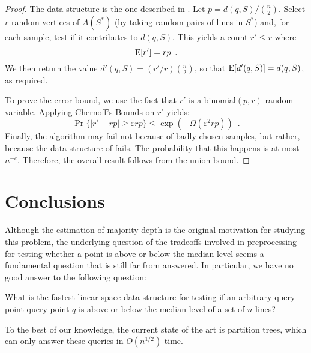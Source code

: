 \documentclass{cccg12}
\newcommand{\eps}{\varepsilon}
\begin{document}
\begin{proof}
  The data structure is the one described in .
  Let $p=d(q,S)/\binom{n}{2}$.  Select $r$ random vertices of $A(S^*)$
  (by taking random pairs of lines in $S^*$) and, for each sample, test
  if it contributes to $d(q,S)$.  This yields a count $r' \le r$ where
  \[ 
     \mathrm{E}[r'] = rp \enspace .
  \]
  We then return the value $d'(q,S)=(r'/r)\binom{n}{2}$, so that
  $\mathrm{E}[d'(q,S)]=d(q,S)$, as required.

  To prove the error bound, we use the fact that $r'$ is a binomial$(p,r)$
  random variable.  Applying Chernoff's Bounds on $r'$ yields:
  \[
     \Pr\{|r' - rp| \ge \eps rp\} \le \exp(-\Omega(\eps^2rp)) \enspace .
  \]
  Finally, the algorithm may fail not because of badly chosen samples,
  but rather, because the data structure of  fails.
  The probability that this happens is at most $n^{-c}$. Therefore,
  the overall result follows from the union bound.
\end{proof}

\section{Conclusions}

Although the estimation of majority depth is the original motivation for
studying this problem, the underlying question of the tradeoffs involved
in preprocessing for testing whether a point is above or below the median
level seems a fundamental question that is still far from answered.  In particular, we have no good answer to the following question:

\begin{op}
What is the fastest linear-space data structure for testing if an
arbitrary query point query point $q$ is above or below the median level
of a set of $n$ lines?
\end{op}

To the best of our knowledge, the current state of the art is partition
trees, which can only answer these queries in $O(n^{1/2})$ time.



\end{document}
